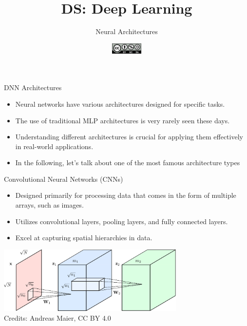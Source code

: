\documentclass[aspectratio=169]{../latex_main/tntbeamer}  %
\title[DL: Neural Architectures]{DS: Deep Learning}
\subtitle{Neural Architectures}
\date{\hspace{0.5em} {\includegraphics[height=1.5em]{../latex_main/figures/Cc-by-nc-sa_icon.svg.png}}}
\begin{document}
	
	\maketitle
    	\begin{frame}{DNN Architectures}

            \begin{itemize}
                \item Neural networks have various architectures designed for specific tasks.
                \item The use of traditional MLP architectures is very rarely seen these days.
                \item Understanding different architectures is crucial for applying them effectively in real-world applications.
                \medskip
                \item In the following, let's talk about one of the most famous architecture types
            \end{itemize}
    
                    
    	\end{frame}

        \begin{frame}{Convolutional Neural Networks (CNNs)}
        \begin{itemize}
            \item Designed primarily for processing data that comes in the form of multiple arrays, such as images.
            \item Utilizes convolutional layers, pooling layers, and fully connected layers.
            \item Excel at capturing spatial hierarchies in data.
        \end{itemize}
        \centering
        \includegraphics[width=0.7\textwidth]{figure/conv.png}\\
        Credits: Andreas Maier, CC BY 4.0
        \end{frame}
\end{document}
